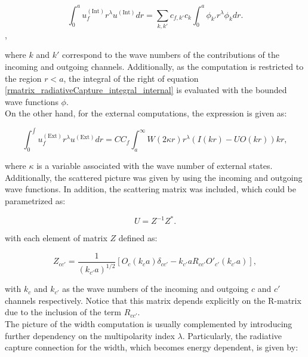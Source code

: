 \documentclass[openany]{book}
\begin{document}
\begin{equation}\label{rmatrix_radiativeCapture_integral_internal}
	\int_0^{a} u^{(\mathrm{Int})}_f r^\lambda u^{(\mathrm{Int})}  dr  = \sum_{k, k'} c_{f, k'} c_{k} \int_0^{a} \phi_{k'} r^\lambda \phi_{k}dr. 
\end{equation},

where $k$ and $k'$ correspond to the wave numbers of the contributions of the incoming and outgoing channels. Additionally, as the computation is restricted to the region $r < a$, the integral of the right of equation \ref{rmatrix_radiativeCapture_integral_internal} is evaluated with the bounded wave functions $\phi$. \\

On the other hand, for the external computations, the expression is given as: 


\begin{equation}\label{rmatrix_radiativeCapture_integral_external}
	\int_0^{\int} u^{(\mathrm{Ext})}_f r^\lambda u^{(\mathrm{Ext})}  dr = C C_f \int_a^{\infty} W (2\kappa r) r^{\lambda} (I(kr) - U O(kr)) kr, 
\end{equation}

where $\kappa$ is a variable associated with the wave number of external states. Additionally, the scattered picture was given by using the incoming and outgoing wave functions. In addition, the scattering matrix was included, which could be parametrized as: 

\begin{equation}\label{rmatrix_collisionMatrix}
	U = Z^{-1} Z^{*}.
\end{equation}

with each element of matrix $Z$ defined as: 

\begin{equation}\label{rmatrix_collisionMatrix_Z}
	Z_{cc'} = \frac{1}{(k_{c'}a)^{1/2}} [O_c (k_c a)\delta_{cc'} - k_{c'}a R_{cc'} O'_{c'} (k_{c'}a) ],
\end{equation}

with $k_{c}$ and $k_{c'}$ as the wave numbers of the incoming and outgoing $c$ and $c'$ channels respectively. Notice that this matrix depends explicitly on the R-matrix due to the inclusion of the term $R_{cc'}$. \\

The picture of the width computation is usually complemented by introducing further dependency on the multipolarity index $\lambda$. Particularly, the radiative capture connection for the width, which becomes energy dependent, is given by:
\end{document}

